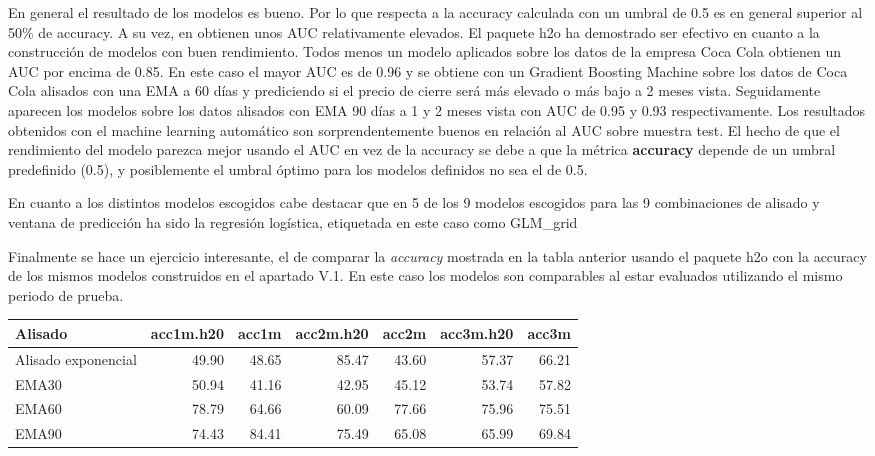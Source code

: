 \documentclass[]{DissertateUSU}
\begin{document}
\noindent En general el resultado de los modelos es bueno. Por lo que
respecta a la accuracy calculada con un umbral de 0.5 es en general
superior al 50\% de accuracy. A su vez, en obtienen unos AUC
relativamente elevados. El paquete h2o ha demostrado ser efectivo en
cuanto a la construcción de modelos con buen rendimiento. Todos menos un
modelo aplicados sobre los datos de la empresa Coca Cola obtienen un AUC
por encima de 0.85. En este caso el mayor AUC es de 0.96 y se obtiene
con un Gradient Boosting Machine sobre los datos de Coca Cola alisados
con una EMA a 60 días y prediciendo si el precio de cierre será más
elevado o más bajo a 2 meses vista. Seguidamente aparecen los modelos
sobre los datos alisados con EMA 90 días a 1 y 2 meses vista con AUC de
0.95 y 0.93 respectivamente. Los resultados obtenidos con el machine
learning automático son sorprendentemente buenos en relación al AUC
sobre muestra test. El hecho de que el rendimiento del modelo parezca
mejor usando el AUC en vez de la accuracy se debe a que la métrica
\textbf{accuracy} depende de un umbral predefinido (0.5), y posiblemente
el umbral óptimo para los modelos definidos no sea el de 0.5.

En cuanto a los distintos modelos escogidos cabe destacar que en 5 de
los 9 modelos escogidos para las 9 combinaciones de alisado y ventana de
predicción ha sido la regresión logística, etiquetada en este caso como
GLM\_grid

\noindent Finalmente se hace un ejercicio interesante, el de comparar la
\emph{accuracy} mostrada en la tabla anterior usando el paquete h2o con
la accuracy de los mismos modelos construidos en el apartado V.1. En
este caso los modelos son comparables al estar evaluados utilizando el
mismo periodo de prueba.

\begin{table}[H]
\centering\begingroup\fontsize{10}{12}\selectfont

\begin{tabular}{l|r|r|r|r|r|r}
\hline
Alisado & acc1m.h20 & acc1m & acc2m.h20 & acc2m & acc3m.h20 & acc3m\\
\hline
Alisado exponencial & 49.90 & 48.65 & 85.47 & 43.60 & 57.37 & 66.21\\
\hline
EMA30 & 50.94 & 41.16 & 42.95 & 45.12 & 53.74 & 57.82\\
\hline
EMA60 & 78.79 & 64.66 & 60.09 & 77.66 & 75.96 & 75.51\\
\hline
EMA90 & 74.43 & 84.41 & 75.49 & 65.08 & 65.99 & 69.84\\
\hline
\end{tabular}
\endgroup{}
\end{table}
\centering
\end{document}
